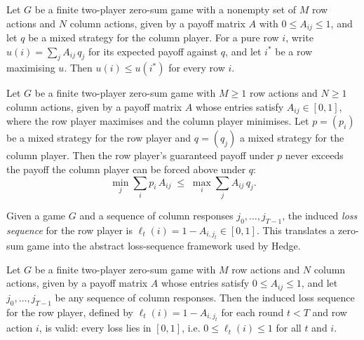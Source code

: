 \begin{lemma}
\label{bestRow_spec}
\leanok
{}
Let $G$ be a finite two-player zero-sum game with a nonempty set of $M$ row actions and
$N$ column actions, given by a payoff matrix $A$ with $0 \le A_{ij} \le 1$, and let $q$
be a mixed strategy for the column player. For a pure row $i$, write $u(i) = \sum_{j}
A_{ij}\, q_j$ for its expected payoff against $q$, and let $i^\ast$ be a row maximising
$u$. Then $u(i) \le u(i^\ast)$ for every row $i$.
\end{lemma}

\begin{theorem}
\label{weak_duality}
\leanok
{}
Let $G$ be a finite two-player zero-sum game with $M \ge 1$ row actions and $N \ge 1$
column actions, given by a payoff matrix $A$ whose entries satisfy $A_{ij} \in [0,1]$,
where the row player maximises and the column player minimises. Let $p = (p_i)$ be a
mixed strategy for the row player and $q = (q_j)$ a mixed strategy for the column
player. Then the row player's guaranteed payoff under $p$ never exceeds the payoff the
column player can be forced above under $q$:
\[
  \min_{j} \sum_{i} p_i\, A_{ij} \;\le\; \max_{i} \sum_{j} A_{ij}\, q_j .
\]
\end{theorem}

\begin{definition}
\label{ZeroSumGame.toLossSeq}
\leanok
{}
Given a game $G$ and a sequence of column responses $j_0, \dots, j_{T-1}$, the
induced \emph{loss sequence} for the row player is $\ell_t(i) = 1 - A_{i,j_t}
\in [0,1]$.  This translates a zero-sum game into the abstract loss-sequence
framework used by Hedge.
\end{definition}

\begin{lemma}
\label{ZeroSumGame.toLossSeq_valid}
\leanok
{}
Let $G$ be a finite two-player zero-sum game with $M$ row actions and $N$ column
actions, given by a payoff matrix $A$ whose entries satisfy $0 \le A_{ij} \le 1$, and
let $j_0, \dots, j_{T-1}$ be any sequence of column responses. Then the induced loss
sequence for the row player, defined by $\ell_t(i) = 1 - A_{i,j_t}$ for each round $t <
T$ and row action $i$, is valid: every loss lies in $[0,1]$, i.e. $0 \le \ell_t(i) \le
1$ for all $t$ and $i$.
\end{lemma}

